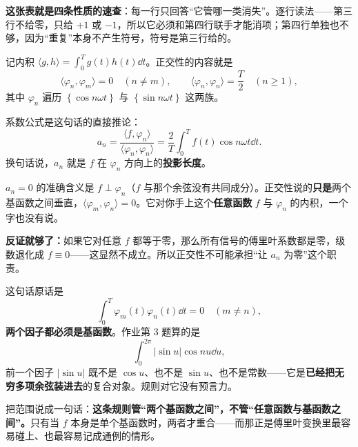 \documentclass[11pt]{ctexart}
\begin{document}
\par\vspace{3pt}
\textbf{这张表就是四条性质的速查}：每一行只回答“它管哪一类消失”。逐行读法——第三行不给零，只给 $+1$ 或 $-1$，所以它必须和第四行联手才能消项；第四行单独也不够，因为“重复”本身不产生符号，符号是第三行给的。




记内积 $\langle g,h\rangle=\int_0^{T}g(t)h(t)\dd t$。正交性的内容就是
\[
\langle\varphi_n,\varphi_m\rangle=0\quad(n\neq m),\qquad
\langle\varphi_n,\varphi_n\rangle=\frac{T}{2}\quad(n\ge1),
\]
其中 $\varphi_n$ 遍历 $\left\{\cos n\omega t\right\}$ 与 $\left\{\sin n\omega t\right\}$ 这两族。

系数公式是这句话的直接推论：
\[
a_n=\frac{\langle f,\varphi_n\rangle}{\langle\varphi_n,\varphi_n\rangle}=\frac{2}{T}\int_0^{T}f(t)\cos n\omega t\dd t .
\]
换句话说，$a_n$ 就是 $f$ 在 $\varphi_n$ 方向上的\textbf{投影长度}。


$a_n=0$ 的准确含义是 $f\perp\varphi_n$（$f$ 与那个余弦没有共同成分）。正交性说的\textbf{只是}两个基函数之间垂直，$\langle\varphi_m,\varphi_n\rangle=0$。它对你手上这个\textbf{任意函数} $f$ 与 $\varphi_n$ 的内积，一个字也没有说。

\textbf{反证就够了：}如果它对任意 $f$ 都等于零，那么所有信号的傅里叶系数都是零，级数退化成 $f\equiv0$——这显然不成立。所以正交性不可能承担“让 $a_n$ 为零”这个职责。


这句话原话是
\[
\int_0^{T}\varphi_m(t)\varphi_n(t)\dd t=0\quad(m\neq n),
\]
\textbf{两个因子都必须是基函数}。作业第 3 题算的是
\[
\int_0^{2\pi}\left|\sin u\right|\cos nu\dd u ,
\]
前一个因子 $|\sin u|$ 既不是 $\cos u$、也不是 $\sin u$、也不是常数——它是\textbf{已经把无穷多项余弦装进去}的复合对象。规则对它没有预言力。

把范围说成一句话：\textbf{这条规则管“两个基函数之间”，不管“任意函数与基函数之间”。}只有当 $f$ 本身是单个基函数时，两者才重合——而那正是傅里叶变换里最容易碰上、也最容易记成通例的情形。
\end{document}
